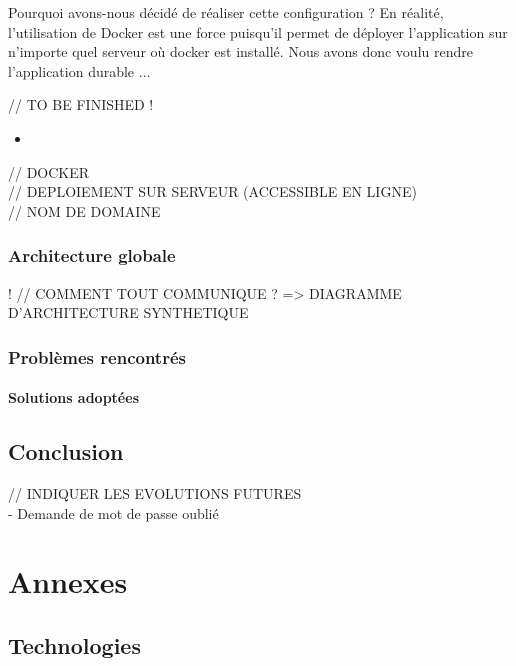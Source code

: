 \documentclass{tnreport}
\begin{document}
Pourquoi avons-nous décidé de réaliser cette configuration ? En réalité, l'utilisation de Docker est une force puisqu'il permet de déployer l'application sur n'importe quel serveur où docker est installé. Nous avons donc voulu rendre l'application durable ...

// TO BE FINISHED !

\begin{itemize}
	\item 
\end{itemize}

// DOCKER \\
// DEPLOIEMENT SUR SERVEUR (ACCESSIBLE EN LIGNE) \\
// NOM DE DOMAINE \\

\section{Architecture globale}
!
// COMMENT TOUT COMMUNIQUE ? => DIAGRAMME D'ARCHITECTURE SYNTHETIQUE

\section{Problèmes rencontrés}

\subsection{Solutions adoptées}

\cleardoublepage

\chapter{Conclusion}

// INDIQUER LES EVOLUTIONS FUTURES \\
 - Demande de mot de passe oublié

\cleardoublepage

\listoffigures

\cleardoublepage

\appendix
\part*{Annexes}

\cleardoublepage

\chapter{Technologies}
\end{document}
